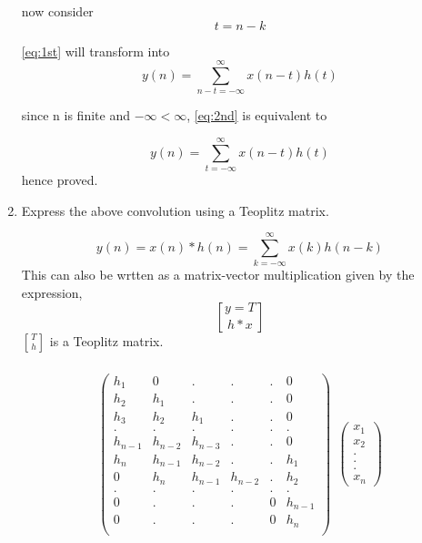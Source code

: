 \documentclass[journal,12pt,twocolumn]{IEEEtran}
\renewcommand\thesection{\arabic{section}}
\begin{document}
\begin{enumerate}[label=\thesection.\arabic*]
	now consider
	\begin{equation}
		t = n-k
	\end{equation}
	
	\ref{eq:1st} will transform into 
	\begin{equation}
		y(n) =  \sum_{n-t=-\infty}^{\infty}x(n-t)h(t) \label{eq:2nd}
	\end{equation}
	
	since n is finite and $-\infty < \infty$, \ref{eq:2nd} is equivalent to 
	
	\begin{equation}
		y(n) =  \sum_{t=-\infty}^{\infty}x(n-t)h(t) \label{eq:3nd}
	\end{equation}
	hence proved.
	
	
	\item Express the above convolution using a Teoplitz matrix.
	
	\begin{equation}
		y(n) = x(n)*h(n) = \sum_{k=-\infty}^{\infty}x(k)h(n-k)
	\end{equation}
	This can also be wrtten as a matrix-vector multiplication given by the expression,
	\begin{equation}
		\label{eq:conv_matrix_vec_mult}
		y = T\brack{h}*x
	\end{equation}
	$T\brack{h}$ is a Teoplitz matrix.
	
	\begin{align*}\\
		\
		\begin{pmatrix}
			h_1 & 0 & . & . & . & 0 \\
			h_2 & h_1 & . & . & . & 0 \\
			h_3 & h_2 & h_1 & . & . & 0 \\
			. & . & . & . & . & . \\
			h_{n-1} & h_{n-2} & h_{n-3} & . & . & 0\\
			h_{n} & h_{n-1} & h_{n-2} & . & . & h_1\\
			0 & h_{n} & h_{n-1} & h_{n-2} & . & h_2\\
			. & . & . & . & . & . \\
			0 & . & . & . & 0 & h_{n-1} \\
			0 & . & . & . & 0 & h_n \\
		\end{pmatrix}
		\
		\
		\begin{pmatrix}
			x_1 \\ x_2 \\ .\\.\\. \\ x_n
		\end{pmatrix}
		\
	\end{align*}
	

\end{enumerate}
\end{document}
